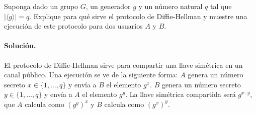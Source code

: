 Suponga dado un grupo $G$, un generador $g$ y un número natural $q$
tal que $|\langle g \rangle| = q$. Explique para qué sirve el
protocolo de Diffie-Hellman y muestre una ejecución de este protocolo
para dos usuarios $A$ y $B$.

\paragraph{Solución.} El protocolo de Diffie-Hellman sirve para compartir una llave simétrica en un canal público. Una ejecución se ve de la siguiente forma: $A$ genera un número secreto $x\in\{1,\ldots,q\}$ y envía a $B$ el elemento $g^x$. $B$ genera un número secreto $y\in\{1,\ldots,q\}$ y envía a $A$ el elemento $g^y$. La llave simétrica compartida será $g^{x\cdot y}$, que $A$ calcula como $(g^y)^x$ y $B$ calcula como $(g^x)^y$.
